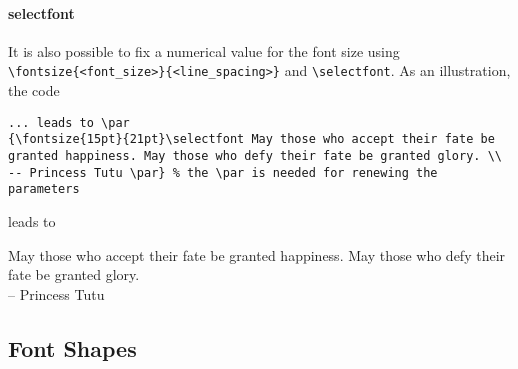 \paragraph{selectfont}
It is also possible to fix a numerical value for the font size using \texttt{\textbackslash fontsize\{<font\_size>\}\{<line\_spacing>\}} and \texttt{\textbackslash selectfont}. As an illustration, the code
\begin{lstlisting}
... leads to \par
{\fontsize{15pt}{21pt}\selectfont May those who accept their fate be granted happiness. May those who defy their fate be granted glory. \\
-- Princess Tutu \par} % the \par is needed for renewing the parameters
\end{lstlisting}
leads to \par
\begin{samepage}
\fontsize{15pt}{21pt}\selectfont May those who accept their fate be granted happiness. May those who defy their fate be granted glory. \\
-- Princess Tutu \par
\end{samepage}

\subsection{Font Shapes}

